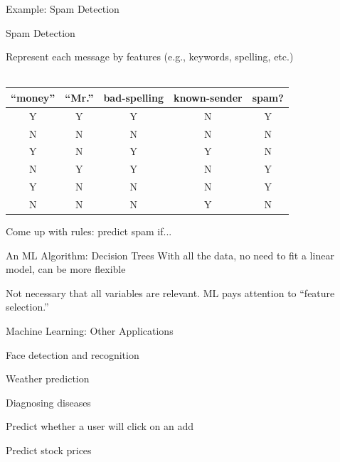 \documentclass{./../div_teaching_slides}
\begin{document}
\begin{frame}{Example: Spam Detection}
\begin{witemize}
\item Spam Detection \\
\item[] Represent each message by features (e.g., keywords, spelling, etc.) \\~\\
\small
\begin{tabular}{cccc|c}
 ``money'' & ``Mr.'' & bad-spelling & known-sender & spam?  \\
  \hline
Y & Y & Y & N & Y \\
N & N & N & N & N \\
Y & N & Y & Y & N \\
N & Y & Y & N & Y \\
Y & N & N & N & Y \\
N & N & N & Y & N \\
\end{tabular}
\end{witemize}
Come up with rules: predict spam if... 
\end{frame}

\begin{frame}{An ML Algorithm: Decision Trees}
\small
With all the data, no need to fit a linear model, can be more flexible \\
\begin{center}
\end{center}
Not necessary that all variables are relevant. ML pays attention to ``feature selection.''
\end{frame}

\begin{frame}{Machine Learning: Other Applications}
\begin{witemize}
  \item Face detection and recognition
  \item Weather prediction
  \item Diagnosing diseases
  \item Predict whether a user will click on an add
  \item Predict stock prices 
\end{witemize}
\end{frame}
\end{document}
